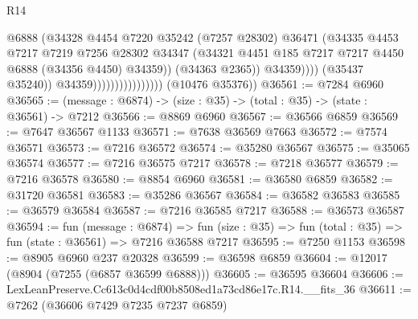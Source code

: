 \begin{lexlean}{R14}
\begin{coremodule}
                                                @6888
                                                (@34328
                                                  @4454
                                                  @7220
                                                  @35242
                                                  (@7257 @28302)
                                                  @36471
                                                  (@34335
                                                    @4453
                                                    @7217
                                                    @7219
                                                    @7256
                                                    @28302
                                                    @34347
                                                    (@34321
                                                      @4451
                                                      @185
                                                      @7217
                                                      @7217
                                                      @4450
                                                      @6888
                                                      (@34356 @4450)
                                                      @34359))
                                                  (@34363 @2365))
                                                @34359))))
                                        (@35437 @35240))
                                      @34359))))))))))))))))
      (@10476 @35376))
@36561 := @7284 @6960
@36565 := (message : @6874) -> (size : @35) -> (total : @35) -> (state : @36561) -> @7212
@36566 := @8869 @6960
@36567 := @36566 @6859
@36569 := @7647 @36567 @1133
@36571 := @7638 @36569 @7663
@36572 := @7574 @36571
@36573 := @7216 @36572
@36574 := @35280 @36567
@36575 := @35065 @36574
@36577 := @7216 @36575 @7217
@36578 := @7218 @36577
@36579 := @7216 @36578
@36580 := @8854 @6960
@36581 := @36580 @6859
@36582 := @31720 @36581
@36583 := @35286 @36567
@36584 := @36582 @36583
@36585 := @36579 @36584
@36587 := @7216 @36585 @7217
@36588 := @36573 @36587
@36594 := fun (message : @6874) =>
  fun (size : @35) => fun (total : @35) => fun (state : @36561) => @7216 @36588 @7217
@36595 := @7250 @1153
@36598 := @8905 @6960 @237 @20328
@36599 := @36598 @6859
@36604 := @12017 (@8904 (@7255 (@6857 @36599 @6888)))
@36605 := @36595 @36604
@36606 := LexLeanPreserve.Cc613c0d4cdf00b8508ed1a73cd86e17c.R14.__fits_36
@36611 := @7262 (@36606 @7429 @7235 @7237 @6859)

\end{coremodule}
\end{lexlean}
